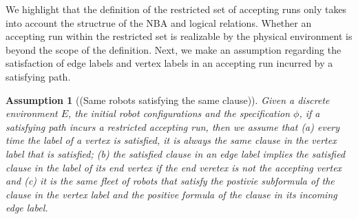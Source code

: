 \documentclass[Afour,sageh,times]{sagej}
\newtheorem{asmp}[thm]{Assumption}
\newcommand{\vertex}[1]{v_{\textup{#1}}}
\newcommand{\simplies}{\DOTSB\Longrightarrow}
\renewcommand{\ap}[3]{\mathcal{\pi}_{{#1},{#2}}^{#3}}
\begin{document}


We highlight that the definition of the restricted set of accepting runs only takes into account the structrue of the  NBA and logical relations. Whether an accepting run within the restricted set is realizable by the physical environment is beyond the scope of the definition.
Next, we make an assumption regarding the satisfaction of edge labels and vertex labels in an accepting run incurred by a satisfying path.
\begin{asmp}[(Same robots satisfying the same clause)]\label{asmp:same}
  Given a discrete environment $E$, the initial robot configurations and the specification $\phi$, if a satisfying path incurs a restricted accepting run, then we assume that (a)\label{asmp:a} every time the label of a vertex is satisfied, it is always the same clause in the vertex label that is satisfied; (b)\label{asmp:b} the satisfied clause in an edge label  implies the  satisfied clause in the label of its end vertex if the end veretex is not the accepting vertex and (c)\label{asmp:c} it is the same fleet of robots that satisfy the  postivie subformula of the clause in the vertex label  and the positive formula of the clause in its incoming edge label.
\end{asmp}
\end{document}

